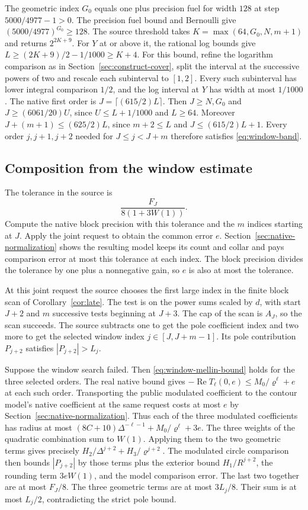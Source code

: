 \documentclass[11pt]{amsart}
\theoremstyle{definition}
\theoremstyle{remark}
\numberwithin{equation}{section}
\newcommand{\re}{\operatorname{Re}}
\begin{document}
The geometric index \(G_0\) equals one plus precision
fuel for width \(128\) at step \(5000/4977-1>0\).
The precision fuel bound and Bernoulli give
\((5000/4977)^{G_0}\ge128\).
The source threshold takes
\(K=\max(64,G_0,N,m+1)\) and returns \(2^{2K+9}\).
For \(Y\) at or above it, the rational log bounds
give \(L\ge(2K+9)/2-1/1000\ge K+4\).
For this bound, refine the logarithm comparison
as in Section~\ref{sec:construct-cover}, split the
interval at the successive powers of two and rescale
each subinterval to \([1,2]\). Every such subinterval
has lower integral comparison \(1/2\), and the log
interval at \(Y\) has width at most \(1/1000\).
The native first order is \(J=\lceil(615/2)L\rceil\).
Then \(J\ge N,G_0\) and \(J\ge(6061/20)U\), since
\(U\le L+1/1000\) and \(L\ge64\).
Moreover \(J+(m+1)\le (625/2)L\), since
\(m+2\le L\) and \(J\le (615/2)L+1\).
Every order \(j,j+1,j+2\) needed for
\(J\le j<J+m\) therefore satisfies
\eqref{eq:window-band}.

\subsection{Composition from the window estimate}

The tolerance in the source is
\[
                    \frac{F_J}{8(1+3W(1))}.
\]
Compute the native block precision with this tolerance
and the \(m\) indices starting at \(J\).
Apply the joint request to obtain the common error \(e\).
Section~\ref{sec:native-normalization} shows the
resulting model keeps its count and collar and pays
comparison error at most this tolerance at each
index. The block precision divides the tolerance
by one plus a nonnegative gain, so \(e\) is also
at most the tolerance.

At this joint request the source chooses the first
large index in the finite block scan of
Corollary~\ref{cor:late}. The test is on the power
sums scaled by \(d\), with start \(J+2\) and \(m\)
successive tests beginning at \(J+3\). The cap of
the scan is \(A_J\), so the scan succeeds.
The source subtracts one to get the pole coefficient
index and two more to get the selected window index
\(j\in[J,J+m-1]\). Its pole contribution
\(P_{j+2}\) satisfies \(|P_{j+2}|>L_j\).

Suppose the window search failed. Then
\eqref{eq:window-mellin-bound} holds for the
three selected orders. The real native bound gives
\(-\re T_\ell(0,e)\le M_0/\varrho^\ell+e\)
at each such order. Transporting the public
modulated coefficient to the contour model's native
coefficient at the same request costs at most \(e\)
by Section~\ref{sec:native-normalization}.
Thus each of the three modulated coefficients has
radius at most
\((8C+10)\Delta^{-\ell-1}
      +M_0/\varrho^\ell+3e\).
The three weights of the quadratic combination sum
to \(W(1)\). Applying them to the two geometric
terms gives precisely
\(H_2/\Delta^{j+2}+H_3/\varrho^{j+2}\).
The modulated circle comparison then bounds
\(|P_{j+2}|\) by those terms plus the exterior bound
\(H_1/R^{j+2}\), the rounding term \(3eW(1)\),
and the model comparison error.
The last two together are at most \(F_J/8\).
The three geometric terms are at most \(3L_j/8\).
Their sum is at most \(L_j/2\), contradicting
the strict pole bound.
\end{document}
